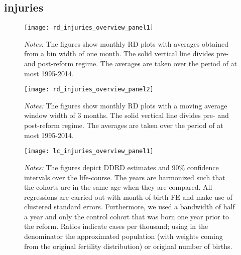 \subsection{injuries}
\begin{landscape}
\begin{figure}[H]
	\centering
	\begin{minipage}{.95\linewidth}
	\texttt{[image: rd\_injuries\_overview\_panel1]}
	{\scriptsize \emph{Notes:} The figures show monthly RD plots with averages obtained from a bin width of one month. The solid vertical line divides pre- and post-reform regime. The averages are taken over the period of at most 1995-2014. \par}
\end{minipage}
\end{figure}
\end{landscape}
\begin{landscape}
\begin{figure}[H]
	\centering
\begin{minipage}{.95\linewidth}
	\texttt{[image: rd\_injuries\_overview\_panel2]}
	{\scriptsize \emph{Notes:} The figures show monthly RD plots with a moving average window width of 3 months. The solid vertical line divides pre- and post-reform regime. The averages are taken over the period of at most 1995-2014. \par}
\end{minipage}
\end{figure}
\end{landscape}


\begin{landscape}
\begin{figure}[H]
\centering
\begin{minipage}{.9\linewidth}
\texttt{[image: lc\_injuries\_overview\_panel1]}
{\scriptsize \emph{Notes:} The figures depict DDRD estimates and 90\% confidence intervals over the life-course. The years are harmonized such that the cohorts are in the same age when they are compared. All regressions are carried out with month-of-birth FE and make use of clustered standard errors. Furthermore, we used a bandwidth of half a year and only the control cohort that was born one year prior to the reform. Ratios indicate cases per thousand; using in the denominator the approximated population (with weights coming from the original fertility distribution) or original number of births. \par}
\end{minipage}
\end{figure}
\end{landscape}
